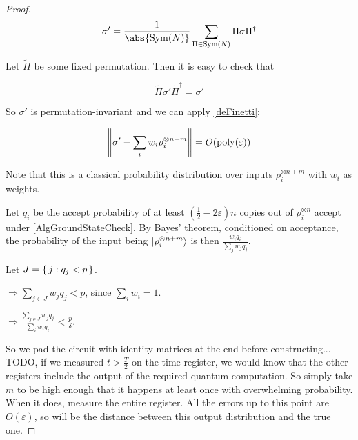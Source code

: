 \begin{proof}
	$$\sigma'=\frac{1}{\abs{\Sym(N)}}\sum_{\Pi\in\Sym(N)}\Pi\sigma\Pi^\dagger$$

	Let $\tilde{\Pi}$ be some fixed permutation. Then it is easy to check that

	$$\tilde{\Pi}\sigma'\tilde{\Pi}^\dagger=\sigma'$$

	So $\sigma'$ is permutation-invariant and we can apply \autoref{deFinetti}:

	$$\left\lVert\sigma'-\sum_i w_i\rho_i^{\otimes n+m}\right\rVert=O(\operatorname*{\operatorname{poly}}(\varepsilon))$$

	Note that this is a classical probability distribution over inputs $\rho_i^{\otimes n+m}$ with $w_i$ as weights.

	Let $q_i$ be the accept probability of at least $(\frac{1}{2}-2\varepsilon)n$ copies out of $\rho_i^{\otimes n}$ accept under \autoref{AlgGroundStateCheck}. By Bayes' theorem, conditioned on acceptance, the probability of the input being $\ket{\rho_i^{\otimes n+m}}$ is then $\frac{w_i q_i}{\sum_j w_j q_j}$.

	Let $J=\set{j:q_j<p}$.

	$\Rightarrow\sum_{j\in J} w_j q_j<p$, since $\sum_i w_i=1$.

	$\Rightarrow\frac{\sum_{j\in J} w_j q_j}{\sum_i w_i q_i}<\frac{p}{\delta}$.

	So we pad the circuit with identity matrices at the end before constructing... TODO, if we measured $t>\frac{T}{2}$ on the time register, we would know that the other registers include the output of the required quantum computation. So simply take $m$ to be high enough that it happens at least once with overwhelming probability. When it does, measure the entire register. All the errors up to this point are $O(\varepsilon)$, so will be the distance between this output distribution and the true one.

\end{proof}
